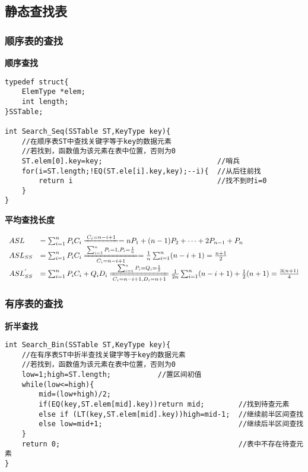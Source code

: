 \documentclass[UTF8]{ctexart}
\newcommand{\mb}[1]{\textbf{#1}}
\newcommand{\p}{\par}
\newcommand{\ma}[1]{\begin{array}{llll} #1 \end{array}}
\newcommand{\meq}[2]{\xlongequal[#2]{#1}}
\begin{document}
\subsection{静态查找表}
\subsubsection{顺序表的查找}

\mb{顺序查找}\p
\begin{lstlisting}[style=v1]
typedef struct{ 
    ElemType *elem;
    int length;
}SSTable;

int Search_Seq(SSTable ST,KeyType key){
    //在顺序表ST中查找关键字等于key的数据元素
    //若找到，函数值为该元素在表中位置，否则为0
    ST.elem[0].key=key;                           //哨兵  
    for(i=ST.length;!EQ(ST.ele[i].key,key);--i){  //从后往前找
        return i                                  //找不到时i=0 
    }
}
\end{lstlisting}

\mb{平均查找长度}\p

$$\ma{ASL&=\sum_{i=1}^nP_iC_i\meq{C_i=n-i+1}{}=nP_1+(n-1)P_2+\dots+2P_{n-1}+P_n\\
    ASL_{SS}&=\sum_{i=1}^nP_iC_i\meq{\sum_{i=1}^nP_i=1,P_i=\frac{1}{n}}{C_i=n-i+1}=\frac{1}{n}\sum_{i=1}^n(n-i+1)=\frac{n+1}{2}\\
    ASL_{SS}^{'}&=\sum_{i=1}^nP_iC_i+Q_iD_i\meq{\sum_{i=1}^nP_i=Q_i=\frac{1}{2}}{C_i=n-i+1,D_i=n+1}\frac{1}{2n}\sum_{i=1}^n(n-i+1)+\frac{1}{2}(n+1)=\frac{3(n+1)}{4}
}$$


\subsubsection{有序表的查找}
\mb{折半查找}\p
\begin{lstlisting}[style=v1]
int Search_Bin(SSTable ST,KeyType key){
    //在有序表ST中折半查找关键字等于key的数据元素
    //若找到，函数值为该元素在表中位置，否则为0
    low=1;high=ST.length;           //置区间初值
    while(low<=high){   
        mid=(low+high)/2;
        if(EQ(key,ST.elem[mid].key))return mid;        //找到待查元素
        else if (LT(key,ST.elem[mid].key))high=mid-1;  //继续前半区间查找
        else low=mid+1;                                //继续后半区间查找
    }                   
    return 0;                                          //表中不存在待查元素
}
\end{lstlisting}
\end{document}
